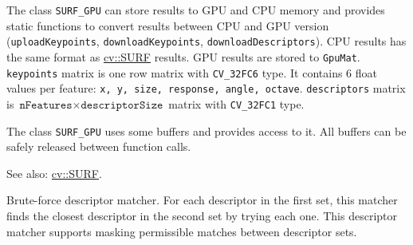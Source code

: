 The class \texttt{SURF\_GPU} can store results to GPU and CPU memory and provides static functions to convert results between CPU and GPU version (\texttt{uploadKeypoints}, \texttt{downloadKeypoints}, \texttt{downloadDescriptors}). CPU results has the same format as \hyperref[cv.class.SURF]{cv::SURF} results. GPU results are stored to \texttt{GpuMat}. \texttt{keypoints} matrix is one row matrix with \texttt{CV\_32FC6} type. It contains 6 float values per feature: \texttt{x, y, size, response, angle, octave}. \texttt{descriptors} matrix is $\texttt{nFeatures} \times \texttt{descriptorSize}$ matrix with \texttt{CV\_32FC1} type.

The class \texttt{SURF\_GPU} uses some buffers and provides access to it. All buffers can be safely released between function calls. 

See also: \hyperref[cv.class.SURF]{cv::SURF}.


Brute-force descriptor matcher. For each descriptor in the first set, this matcher finds the closest descriptor in the second set by trying each one. This descriptor matcher supports masking permissible matches between descriptor sets.

